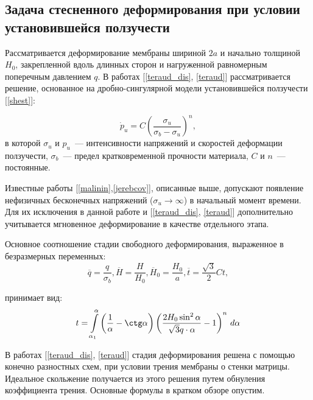 \subsection{Задача стесненного деформирования при условии установившейся ползучести}
Рассматривается деформирование мембраны шириной $2a$ и начально толщиной $H_0$, закрепленной вдоль длинных сторон и нагруженной равномерным поперечным давлением $q$.
В работах [\ref{teraud_dis}, \ref{teraud}] рассматривается решение, основанное на дробно-сингулярной модели установившейся ползучести [\ref{shest}]:

 \begin{equation}
  \dot{p}_u = C \left( \frac{\sigma_u}{\sigma_b - \sigma_u} \right)^n, 
  \label{main_equation}
 \end{equation}
в которой $\sigma_u$ и $\textit{\.{p}}_u$~--- интенсивности напряжений и скоростей деформации ползучести, $\sigma_b$~--- предел кратковременной прочности материала, $C$ и $n$~--- постоянные.


 Известные работы [\ref{malinin},\ref{jerebcov}], описанные выше, допускают появление нефизичных бесконечных напряжений ($\sigma_u \to \infty$) в начальный момент времени. Для их исключения в данной работе и [\ref{teraud_dis}, \ref{teraud}] дополнительно учитывается мгновенное деформирование в качестве отдельного этапа.
 
 Основное соотношение стадии свободного деформирования, выраженное в безразмерных переменных:
 \begin{equation}
	\overline{q} = \dfrac{q}{\sigma_b}, \overline{H} = \dfrac{H}{H_0}, \overline{H}_0 = \dfrac{H_0}{a}, \overline{t} = \dfrac{\sqrt 3}{2}Ct, 
 \end{equation}   

принимает вид:
\begin{equation}
t=\int\limits_{\alpha_1}^{\alpha}\left(\dfrac{1}{\alpha}-\ctg \alpha\right)\left(\dfrac{2H_0\sin^2\alpha}{\sqrt 3 q \cdot \alpha}-1\right)^n \, d\alpha
\end{equation}   

В работах [\ref{teraud_dis}, \ref{teraud}] стадия деформирования решена с помощью конечно разностных схем, при условии трения 
мембраны о стенки матрицы. Идеальное скольжение получается из этого решения путем обнуления коэффициента трения.
Основные формулы в кратком обзоре опустим.

